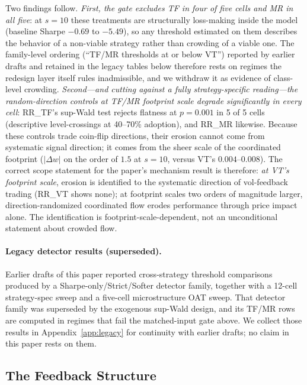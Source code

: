 \documentclass[12pt,a4paper]{article}
\begin{document}
Two findings follow. \emph{First, the gate excludes TF in four of five cells and MR in all five}: at $s = 10$ these treatments are structurally loss-making inside the model (baseline Sharpe $-0.69$ to $-5.49$), so any threshold estimated on them describes the behavior of a non-viable strategy rather than crowding of a viable one. The family-level ordering (``TF/MR thresholds at or below VT'') reported by earlier drafts and retained in the legacy tables below therefore rests on regimes the redesign layer itself rules inadmissible, and we withdraw it as evidence of class-level crowding. \emph{Second---and cutting against a fully strategy-specific reading---the random-direction controls at TF/MR footprint scale degrade significantly in every cell}: RR\_TF's sup-Wald test rejects flatness at $p = 0.001$ in 5 of 5 cells (descriptive level-crossings at 40--70\% adoption), and RR\_MR likewise. Because these controls trade coin-flip directions, their erosion cannot come from systematic signal direction; it comes from the sheer scale of the coordinated footprint ($|\Delta w|$ on the order of $1.5$ at $s=10$, versus VT's $0.004$--$0.008$). The correct scope statement for the paper's mechanism result is therefore: \emph{at VT's footprint scale}, erosion is identified to the systematic direction of vol-feedback trading (RR\_VT shows none); at footprint scales two orders of magnitude larger, direction-randomized coordinated flow erodes performance through price impact alone. The identification is footprint-scale-dependent, not an unconditional statement about crowded flow.

\paragraph{Legacy detector results (superseded).} Earlier drafts of this paper reported cross-strategy threshold comparisons produced by a Sharpe-only/Strict/Softer detector family, together with a 12-cell strategy-spec sweep and a five-cell microstructure OAT sweep. That detector family was superseded by the exogenous sup-Wald design, and its TF/MR rows are computed in regimes that fail the matched-input gate above. We collect those results in Appendix~\ref{app:legacy} for continuity with earlier drafts; no claim in this paper rests on them.

\subsection{The Feedback Structure}
\end{document}
